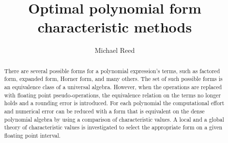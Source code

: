 \documentclass[]{elsarticle}
\begin{document}
\begin{frontmatter}
\author{Michael Reed}%
\address{Crucial Flow Research}
\title{Optimal polynomial form characteristic methods}

\begin{abstract}
There are several possible forms for a polynomial expression's terms, such as factored form, expanded form, Horner form, and many others.
The set of such possible forms is an equivalence class of a universal algebra. However, when the operations are replaced with floating point pseudo-operations, the equivalence relation on the terms no longer holds and a rounding error is introduced.
For each polynomial the computational effort and numerical error can be reduced with a form that is equivalent on the dense polynomial algebra by using a comparison of characteristic values. A local and a global theory of characteristic values is investigated to select the appropriate form on a given floating point interval.
\end{abstract}


\end{frontmatter}
\end{document}
